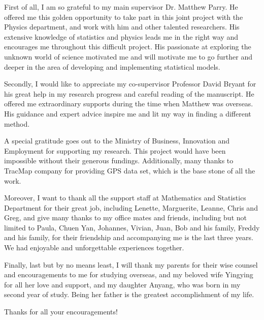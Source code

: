 First of all, I am so grateful to my main supervisor Dr. Matthew Parry. He offered me this golden opportunity to take part in this joint project with the Physics department, and work with him and other talented researchers. His extensive knowledge of statistics and physics leads me in the right way and encourages me throughout this difficult project. His passionate at exploring the unknown world of science motivated me and will motivate me to go further and deeper in the area of developing and implementing statistical models.  

Secondly, I would like to appreciate my co-supervisor Professor David Bryant for his great help in my research progress and careful reading of the manuscript. He offered me extraordinary supports during the time when Matthew was overseas. His guidance and expert advice inspire me and lit my way in finding a different method. 

A special gratitude goes out to the Ministry of Business, Innovation and Employment for supporting my research. This project would have been impossible without their generous fundings. Additionally, many thanks to TracMap company for providing GPS data set, which is the base stone of all the work. 

Moreover, I want to thank all the support staff at Mathematics and Statistics Department for their great job, including Lenette, Marguerite, Leanne, Chris and Greg, and give many thanks to my office mates and friends, including but not limited to Paula, Chuen Yan, Johannes, Vivian, Juan, Bob and his family, Freddy and his family, for their friendship and accompanying me is the last three years. We had enjoyable and unforgettable experiences together. 

Finally, last but by no means least, I will thank my parents for their wise counsel and encouragements to me for studying overseas, and my beloved wife Yingying for all her love and support, and my daughter Anyang, who was born in my second year of study. Being her father is the greatest accomplishment of my life.

Thanks for all your encouragements! 

